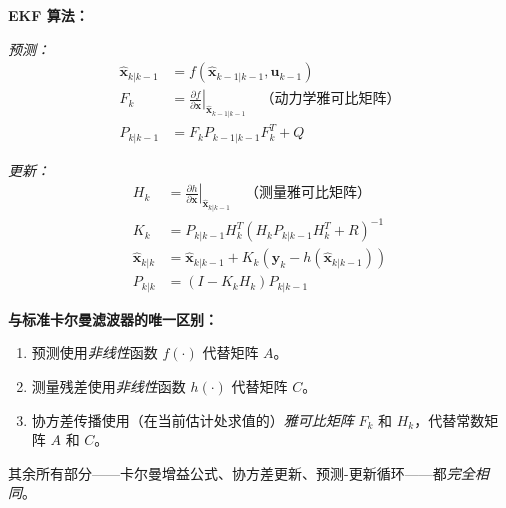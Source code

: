 \textbf{EKF 算法：}

\textit{预测：}
\begin{align}
\hat{\mathbf{x}}_{k|k-1} &= f(\hat{\mathbf{x}}_{k-1|k-1}, \mathbf{u}_{k-1}) \\
F_k &= \left.\frac{\partial f}{\partial \mathbf{x}}\right|_{\hat{\mathbf{x}}_{k-1|k-1}} \quad \text{（动力学雅可比矩阵）} \\
P_{k|k-1} &= F_k P_{k-1|k-1} F_k^T + Q
\end{align}

\textit{更新：}
\begin{align}
H_k &= \left.\frac{\partial h}{\partial \mathbf{x}}\right|_{\hat{\mathbf{x}}_{k|k-1}} \quad \text{（测量雅可比矩阵）} \\
K_k &= P_{k|k-1} H_k^T (H_k P_{k|k-1} H_k^T + R)^{-1} \\
\hat{\mathbf{x}}_{k|k} &= \hat{\mathbf{x}}_{k|k-1} + K_k \left(\mathbf{y}_k - h(\hat{\mathbf{x}}_{k|k-1})\right) \\
P_{k|k} &= (I - K_k H_k) P_{k|k-1}
\end{align}

\textbf{与标准卡尔曼滤波器的唯一区别：}
\begin{enumerate}
    \item 预测使用\textit{非线性}函数 $f(\cdot)$ 代替矩阵 $A$。
    \item 测量残差使用\textit{非线性}函数 $h(\cdot)$ 代替矩阵 $C$。
    \item 协方差传播使用（在当前估计处求值的）\textit{雅可比矩阵} $F_k$ 和 $H_k$，代替常数矩阵 $A$ 和 $C$。
\end{enumerate}

其余所有部分——卡尔曼增益公式、协方差更新、预测-更新循环——都\textit{完全相同}。

